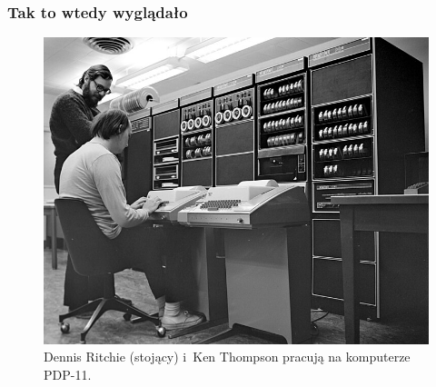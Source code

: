 \documentclass[10pt,t]{beamer}
\begin{document}
\begin{frame}
  \frametitle{Tak to wtedy wyglądało}


  \begin{figure}

    \centering


    \includegraphics[scale=0.3]
    {./PresentationsPictures/OS-heroes-Pictures/Dennis-Ritchie-Ken-Thompson-PDP-11.jpg}

    \caption{Dennis Ritchie (stojący) i~Ken Thompson pracują na komputerze
      PDP-11.}

    \label{fig:Titchie-Thompson-PDP-11}

  \end{figure}

\end{frame}
\end{document}
